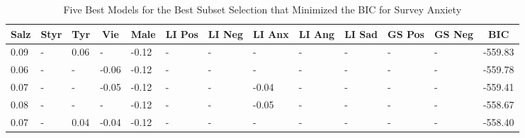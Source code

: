 \documentclass[
  english,
  jou,floatsintext]{apa7}
\begin{document}
\begin{table}[h]

\begin{center}
\begin{threeparttable}

\caption{\label{tab:subset-detail-4}Five Best Models for the Best Subset Selection that Minimized the BIC for Survey Anxiety}

\small{

\begin{tabular}{lllllllllllll}
\toprule
Salz & \multicolumn{1}{c}{Styr} & \multicolumn{1}{c}{Tyr} & \multicolumn{1}{c}{Vie} & \multicolumn{1}{c}{Male} & \multicolumn{1}{c}{LI Pos} & \multicolumn{1}{c}{LI Neg} & \multicolumn{1}{c}{LI Anx} & \multicolumn{1}{c}{LI Ang} & \multicolumn{1}{c}{LI Sad} & \multicolumn{1}{c}{GS Pos} & \multicolumn{1}{c}{GS Neg} & \multicolumn{1}{c}{BIC}\\
\midrule
0.09 & - & 0.06 & - & -0.12 & - & - & - & - & - & - & - & -559.83\\
0.06 & - & - & -0.06 & -0.12 & - & - & - & - & - & - & - & -559.78\\
0.07 & - & - & -0.05 & -0.12 & - & - & -0.04 & - & - & - & - & -559.41\\
0.08 & - & - & - & -0.12 & - & - & -0.05 & - & - & - & - & -558.67\\
0.07 & - & 0.04 & -0.04 & -0.12 & - & - & - & - & - & - & - & -558.40\\
\bottomrule
\end{tabular}

}

\end{threeparttable}
\end{center}

\end{table}
\end{document}
